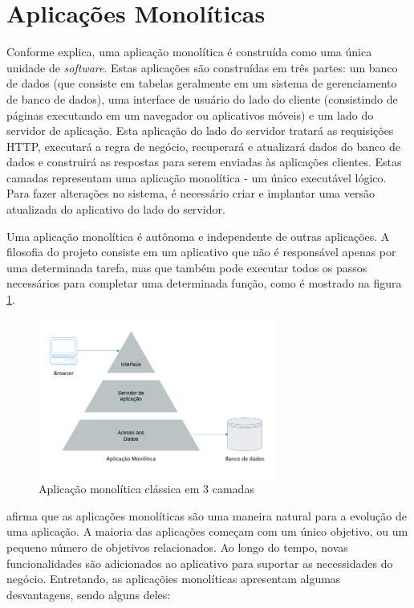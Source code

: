\section{Aplicações Monolíticas}\label{sec:monolitico}

Conforme  explica, uma aplicação monolítica é construída como uma única unidade de \textit{software}. Estas aplicações são construídas em três partes: um banco de dados (que consiste em tabelas geralmente em um sistema de gerenciamento de banco de dados), uma interface de usuário do lado do cliente (consistindo de páginas executando em um navegador ou aplicativos móveis) e um lado do servidor de aplicação. Esta aplicação do lado do servidor tratará as requisições HTTP, executará a regra de negócio, recuperará e atualizará dados do banco de dados e construirá as respostas para serem enviadas às aplicações clientes. Estas camadas representam uma aplicação monolítica - um único executável lógico. Para fazer alterações no sistema, é necessário criar e implantar uma versão atualizada do aplicativo do lado do servidor.

Uma aplicação monolítica é autônoma e independente de outras aplicações. A filosofia do projeto consiste em um aplicativo que não é responsável apenas por uma determinada tarefa, mas que também pode executar todos os passos necessários para completar uma determinada função, como é mostrado na figura \ref{fig:three-tier}.

\begin{figure}[htbp]
    \centering
    \includegraphics[width=0.7\textwidth]{figuras/monolithic-3-tier.png}
    \caption{Aplicação monolítica clássica em 3 camadas}
    \label{fig:three-tier}
\end{figure}

 afirma que as aplicações monolíticas são uma maneira natural para a evolução de uma aplicação. A maioria das aplicações começam com um único objetivo, ou um pequeno número de objetivos relacionados. Ao longo do tempo, novas funcionalidades são adicionados ao aplicativo para suportar as necessidades do negócio. Entretando, as aplicaçõies monolíticas apresentam algumas desvantagens, sendo alguns deles: 

